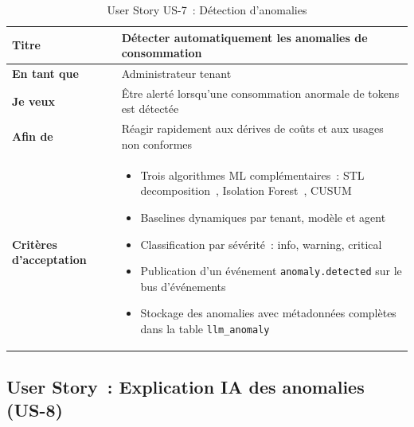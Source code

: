 \begin{table}[H]
\centering
\caption{User Story US-7~: Détection d'anomalies}
\label{tab:us7}
\begin{tabularx}{\textwidth}{|l|X|}
\hline
\textbf{Titre} & Détecter automatiquement les anomalies de consommation \\
\hline
\textbf{En tant que} & Administrateur tenant \\
\hline
\textbf{Je veux} & Être alerté lorsqu'une consommation anormale de tokens est détectée \\
\hline
\textbf{Afin de} & Réagir rapidement aux dérives de coûts et aux usages non conformes \\
\hline
\textbf{Critères d'acceptation} & \begin{minipage}[t]{\linewidth}\vspace{2pt}
\begin{itemize}[noitemsep,topsep=0pt]
\item Trois algorithmes ML complémentaires~: STL decomposition~\cite{cleveland1990}, Isolation Forest~\cite{liu2008}, CUSUM~\cite{page1954}
\item Baselines dynamiques par tenant, modèle et agent
\item Classification par sévérité~: info, warning, critical
\item Publication d'un événement \texttt{anomaly.detected} sur le bus d'événements
\item Stockage des anomalies avec métadonnées complètes dans la table \texttt{llm\_anomaly}
\end{itemize}\vspace{2pt}
\end{minipage} \\
\hline
\end{tabularx}
\end{table}

\subsection{User Story~: Explication IA des anomalies (US-8)}

